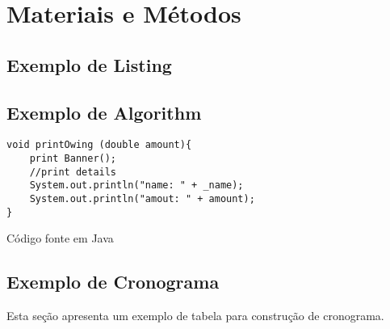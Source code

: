\section{Materiais e Métodos}
\label{sec:meteriais}



\subsection{Exemplo de Listing}




\subsection{Exemplo de Algorithm}

\begin{algorithm}
\begin{scriptsize}
\begin{lstlisting}
void printOwing (double amount){
	print Banner();
	//print details
    System.out.println("name: " + _name);
    System.out.println("amout: " + amount);
}
\end{lstlisting}
\end{scriptsize}

\caption{Código fonte em Java}
\label{alg:codigo_java}

\end{algorithm}




\subsection{Exemplo de Cronograma}

Esta seção apresenta um exemplo de tabela para construção de cronograma.

